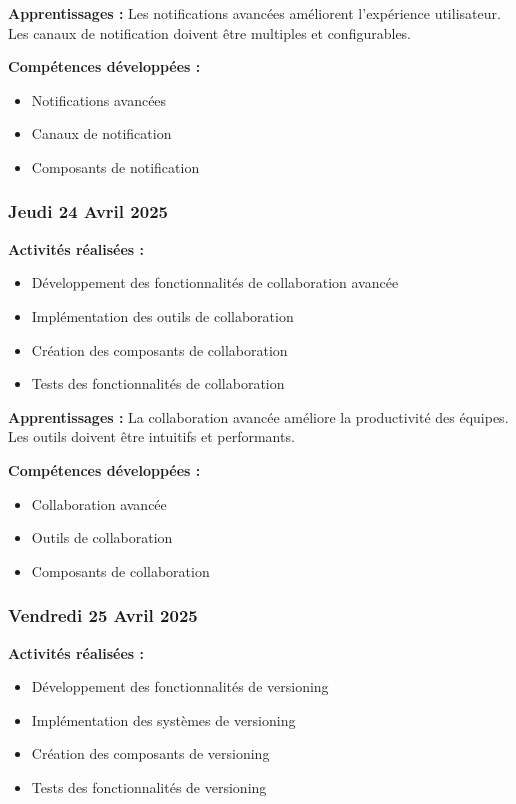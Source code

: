 \documentclass[12pt,a4paper]{article}
\begin{document}
\textbf{Apprentissages :}
Les notifications avancées améliorent l'expérience utilisateur. Les canaux de notification doivent être multiples et configurables.

\textbf{Compétences développées :}
\begin{itemize}
    \item Notifications avancées
    \item Canaux de notification
    \item Composants de notification
\end{itemize}

\subsubsection{Jeudi 24 Avril 2025}
\textbf{Activités réalisées :}
\begin{itemize}
    \item Développement des fonctionnalités de collaboration avancée
    \item Implémentation des outils de collaboration
    \item Création des composants de collaboration
    \item Tests des fonctionnalités de collaboration
\end{itemize}

\textbf{Apprentissages :}
La collaboration avancée améliore la productivité des équipes. Les outils doivent être intuitifs et performants.

\textbf{Compétences développées :}
\begin{itemize}
    \item Collaboration avancée
    \item Outils de collaboration
    \item Composants de collaboration
\end{itemize}

\subsubsection{Vendredi 25 Avril 2025}
\textbf{Activités réalisées :}
\begin{itemize}
    \item Développement des fonctionnalités de versioning
    \item Implémentation des systèmes de versioning
    \item Création des composants de versioning
    \item Tests des fonctionnalités de versioning
\end{itemize}
\end{document}
